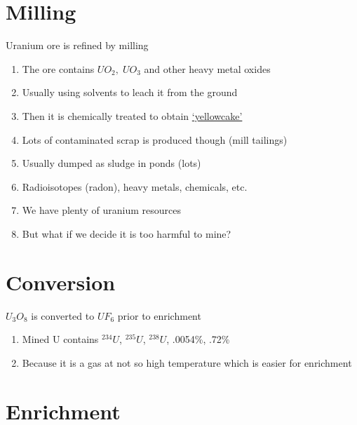 \documentclass[aspectratio=1610,pdftex,dvipsnames,compress,xcolor={dvipsnames}]{beamer}
\begin{document}
\section{Milling}


\addtocounter{framenumber}{-1} 
\begin{frame}{Uranium ore is refined by milling}
    \begin{enumerate}[series=outerlist,topsep=0pt,itemsep=18pt,leftmargin=*,label=(\arabic*)]
        \item[]The ore contains $UO_2, \; UO_3$ and other heavy metal oxides
        \item[]Usually using solvents to leach it from the ground
        \item[]Then it is chemically treated to obtain \href{http://ibankcoin.com/zeropointnow/files/2017/11/c5fbed2f-575a-41bb-886e-f26700d43255-2060x1236-2.jpeg}{`yellowcake'}
        \item[]Lots of contaminated scrap is produced though (mill tailings)
        \item[]Usually dumped as sludge in ponds (lots)
        \item[]Radioisotopes (radon), heavy metals, chemicals, etc.
        \item[]We have plenty of uranium resources
        \item[]But what if we decide it is too harmful to mine?
    \end{enumerate}
\end{frame}


\section{Conversion}


\addtocounter{framenumber}{-1} 
\begin{frame}{$U_3O_8$ is converted to $UF_6$ prior to enrichment}
    \begin{enumerate}[series=outerlist,topsep=0pt,itemsep=21pt,leftmargin=*,label=(\arabic*)]
        \item[]Mined U contains $^{234}U$, $^{235}U$, $^{238}U$, .0054\%, .72\%
        \item[]Because it is a gas at not so high temperature which is easier for enrichment
    \end{enumerate}
\end{frame}


\section{Enrichment}
\end{document}
